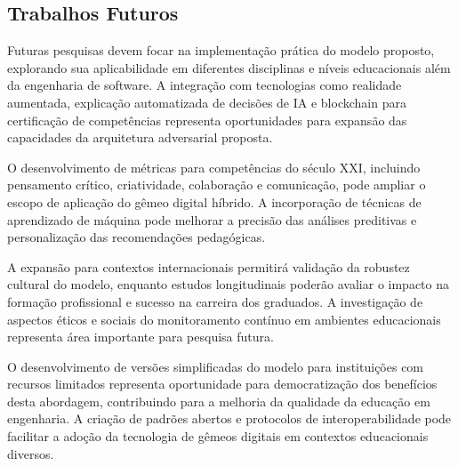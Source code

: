 \documentclass[english, spanish, brazilian]{modelo_dt}
\begin{document}
\subsection{Trabalhos Futuros}

Futuras pesquisas devem focar na implementação prática do modelo proposto, explorando sua aplicabilidade em diferentes disciplinas e níveis educacionais além da engenharia de software\@. A integração com tecnologias como realidade aumentada, explicação automatizada de decisões de IA e blockchain para certificação de competências representa oportunidades para expansão das capacidades da arquitetura adversarial proposta\@.

O desenvolvimento de métricas para competências do século XXI, incluindo pensamento crítico, criatividade, colaboração e comunicação, pode ampliar o escopo de aplicação do gêmeo digital híbrido\@. A incorporação de técnicas de aprendizado de máquina pode melhorar a precisão das análises preditivas e personalização das recomendações pedagógicas\@.

A expansão para contextos internacionais permitirá validação da robustez cultural do modelo, enquanto estudos longitudinais poderão avaliar o impacto na formação profissional e sucesso na carreira dos graduados\@. A investigação de aspectos éticos e sociais do monitoramento contínuo em ambientes educacionais representa área importante para pesquisa futura\@.

O desenvolvimento de versões simplificadas do modelo para instituições com recursos limitados representa oportunidade para democratização dos benefícios desta abordagem, contribuindo para a melhoria da qualidade da educação em engenharia\@. A criação de padrões abertos e protocolos de interoperabilidade pode facilitar a adoção da tecnologia de gêmeos digitais em contextos educacionais diversos\@.

\printbibliography{}
\end{document}
